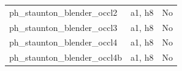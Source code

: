 \begin{longtable}{>{\raggedright\arraybackslash}p{.47\linewidth}>{\raggedright\arraybackslash}p{.25\linewidth}l}
ph\_\allowbreak{}staunton\_\allowbreak{}blender\_\allowbreak{}occl2 & %
a1, h8 & %
No \\ %

ph\_\allowbreak{}staunton\_\allowbreak{}blender\_\allowbreak{}occl3 & %
a1, h8 & %
No \\ %

ph\_\allowbreak{}staunton\_\allowbreak{}blender\_\allowbreak{}occl4 & %
a1, h8 & %
No \\ %

ph\_\allowbreak{}staunton\_\allowbreak{}blender\_\allowbreak{}occl4b & %
a1, h8 & %
No \\ %


\end{longtable}
